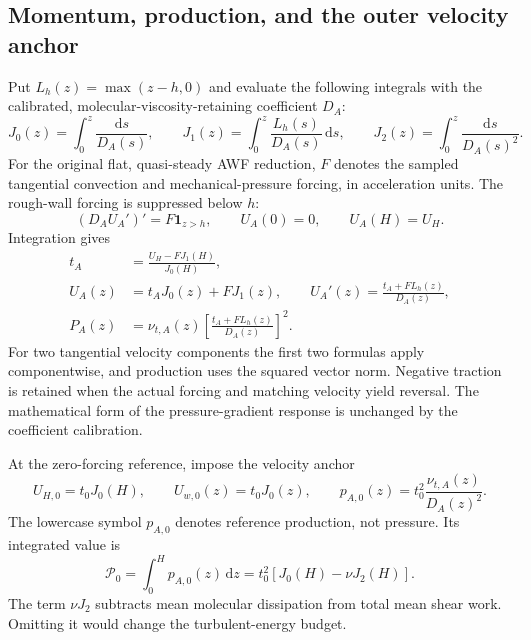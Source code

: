 \documentclass[11pt,a4paper]{article}
\numberwithin{equation}{section}
\begin{document}
\subsection{Momentum, production, and the outer velocity anchor}
\label{ba:momentum}

Put $L_h(z)=\max(z-h,0)$ and evaluate the following integrals with the
calibrated, molecular-viscosity-retaining coefficient $D_A$:
\begin{equation}
 J_0(z)=\int_0^z\frac{\mathrm ds}{D_A(s)},\qquad
 J_1(z)=\int_0^z\frac{L_h(s)}{D_A(s)}\,\mathrm ds,\qquad
 J_2(z)=\int_0^z\frac{\mathrm ds}{D_A(s)^2}.
 \label{ba:integrals}
\end{equation}
For the original flat, quasi-steady AWF reduction, $F$ denotes the sampled
tangential convection and mechanical-pressure forcing, in acceleration
units. The rough-wall forcing is suppressed below $h$:
\begin{equation}
 (D_AU_A')'=F\mathbf1_{z>h},\qquad U_A(0)=0,\qquad U_A(H)=U_H.
 \label{ba:momentum-ode}
\end{equation}
Integration gives
\begin{equation}
 \boxed{\begin{aligned}
 t_A&=\frac{U_H-FJ_1(H)}{J_0(H)},\\
 U_A(z)&=t_AJ_0(z)+FJ_1(z),\qquad
 U_A'(z)=\frac{t_A+FL_h(z)}{D_A(z)},\\
 P_A(z)&=\nu_{t,A}(z)
          \left[\frac{t_A+FL_h(z)}{D_A(z)}\right]^2.
 \end{aligned}}
 \label{ba:forced-awf}
\end{equation}
For two tangential velocity components the first two formulas apply
componentwise, and production uses the squared vector norm. Negative
traction is retained when the actual forcing and matching velocity yield
reversal. The mathematical form of the pressure-gradient response is
unchanged by the coefficient calibration.

At the zero-forcing reference, impose the velocity anchor
\begin{equation}
 U_{H,0}=t_0J_0(H),\qquad
 U_{w,0}(z)=t_0J_0(z),\qquad
 p_{A,0}(z)=t_0^2\frac{\nu_{t,A}(z)}{D_A(z)^2}.
 \label{ba:reference-production}
\end{equation}
The lowercase symbol $p_{A,0}$ denotes reference production, not pressure.
Its integrated value is
\begin{equation}
 \boxed{\mathcal P_0=\int_0^H p_{A,0}(z)\,\mathrm dz
 =t_0^2[J_0(H)-\nu J_2(H)].}
 \label{ba:production-budget}
\end{equation}
The term $\nu J_2$ subtracts mean molecular dissipation from total
mean shear work. Omitting it would change the turbulent-energy budget.
\end{document}
